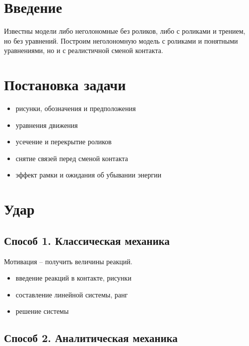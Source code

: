 



\section{Введение}

Известны модели либо неголономные без роликов, либо с роликами и трением, но без уравнений.
Построим неголономную модель с роликами и понятными уравнениями, но и с реалистичной сменой контакта.

\section{Постановка задачи}

\begin{itemize}
    \item рисунки, обозначения и предположения
    \item уравнения движения
    \item усечение и перекрытие роликов
    \item снятие связей перед сменой контакта
    \item эффект рамки и ожидания об убывании энергии
\end{itemize}

\section{Удар}

\subsection{Способ 1. Классическая механика}

Мотивация -- получить величины реакций.

\begin{itemize}
    \item введение реакций в контакте, рисунки
    \item составление линейной системы, ранг
    \item решение системы
\end{itemize}

\subsection{Способ 2. Аналитическая механика}

